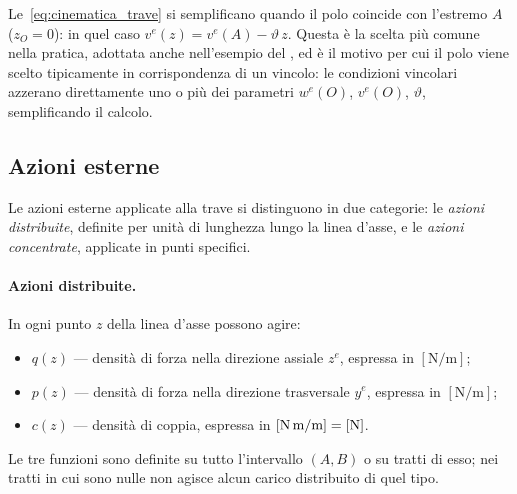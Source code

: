 \begin{oss}
	Le~\eqref{eq:cinematica_trave} si semplificano
	quando il polo coincide con l'estremo $A$
	($z_O = 0$): in quel caso $v^e(z) = v^e(A)
	- \vartheta\, z$. Questa è la scelta più
	comune nella pratica, adottata anche
	nell'esempio del ,
	ed è il motivo per cui il polo viene scelto
	tipicamente in corrispondenza di un vincolo:
	le condizioni vincolari azzerano direttamente
	uno o più dei parametri $w^e(O)$, $v^e(O)$,
	$\vartheta$, semplificando il calcolo.
\end{oss}





\subsection{Azioni esterne}
\label{sec:azioni_esterne}

Le azioni esterne applicate alla trave si distinguono
in due categorie: le \emph{azioni distribuite},
definite per unità di lunghezza lungo la linea d'asse,
e le \emph{azioni concentrate}, applicate in punti
specifici.

\paragraph{Azioni distribuite.}
In ogni punto $z$ della linea d'asse possono agire:
\begin{itemize}[nosep]
	\item $q(z)$ --- densità di forza nella direzione
	assiale $z^e$, espressa in $[\text{N/m}]$;
	\item $p(z)$ --- densità di forza nella direzione
	trasversale $y^e$, espressa in $[\text{N/m}]$;
	\item $c(z)$ --- densità di coppia, espressa in
	$[\text{N\,m/m}] = [\text{N}]$.
\end{itemize}
Le tre funzioni sono definite su tutto l'intervallo
$(A, B)$ o su tratti di esso; nei tratti in cui sono
nulle non agisce alcun carico distribuito di quel tipo.

